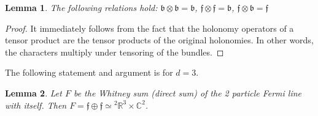 \documentclass[11pt]{article}
\newtheorem{lemma}{Lemma}
\theoremstyle{remark}
\begin{document}
\begin{lemma}
The following relations hold: $\ensuremath{\mathfrak{b}} \otimes \ensuremath{\mathfrak{b}} =
\ensuremath{\mathfrak{b}}$,  $\ensuremath{\mathfrak{f}} \otimes \ensuremath{\mathfrak{f}} =
\ensuremath{\mathfrak{b}}$, $\ensuremath{\mathfrak{f}} \otimes \ensuremath{\mathfrak{b}} =
\ensuremath{\mathfrak{f}}$
\end{lemma}

\begin{proof}
It immediately follows from the fact that the holonomy operators of a
tensor product are the tensor products of the original holonomies.
In other words, the characters multiply under tensoring of the bundles. 
\end{proof}

The following statement and argument is for $\ensuremath{d} =3$. 

\begin{lemma}
Let $F$ be the Whitney sum (direct sum) 
of the 2 particle Fermi line with itself. 
Then $F = \ensuremath{\mathfrak{f}} \oplus \ensuremath{\mathfrak{f}} \ensuremath{\simeq} {}^2\mathbb{R}^3
\times \ensuremath{\mathbb{C}}^2$. 
\end{lemma} 
\end{document}
